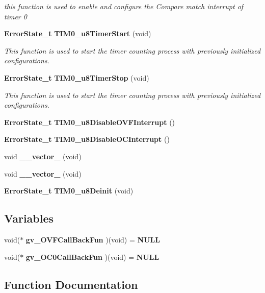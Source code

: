 \begin{DoxyCompactItemize}
\begin{DoxyCompactList}\small\item\em this function is used to enable and configure the Compare match interrupt of timer 0 \end{DoxyCompactList}\item 
\textbf{ Error\+State\+\_\+t} \textbf{ T\+I\+M0\+\_\+u8\+Timer\+Start} (void)
\begin{DoxyCompactList}\small\item\em This function is used to start the timer counting process with previously initialized configurations. \end{DoxyCompactList}\item 
\textbf{ Error\+State\+\_\+t} \textbf{ T\+I\+M0\+\_\+u8\+Timer\+Stop} (void)
\begin{DoxyCompactList}\small\item\em This function is used to start the timer counting process with previously initialized configurations. \end{DoxyCompactList}\item 
\textbf{ Error\+State\+\_\+t} \textbf{ T\+I\+M0\+\_\+u8\+Disable\+O\+V\+F\+Interrupt} ()
\item 
\textbf{ Error\+State\+\_\+t} \textbf{ T\+I\+M0\+\_\+u8\+Disable\+O\+C\+Interrupt} ()
\item 
void \textbf{ \+\_\+\+\_\+vector\+\_} (void)
\item 
void \textbf{ \+\_\+\+\_\+vector\+\_} (void)
\item 
\textbf{ Error\+State\+\_\+t} \textbf{ T\+I\+M0\+\_\+u8\+Deinit} (void)
\end{DoxyCompactItemize}
\subsection*{Variables}
\begin{DoxyCompactItemize}
\item 
void($\ast$ \textbf{ gv\+\_\+\+O\+V\+F\+Call\+Back\+Fun} )(void) =\textbf{ N\+U\+LL}
\item 
void($\ast$ \textbf{ gv\+\_\+\+O\+C0\+Call\+Back\+Fun} )(void) =\textbf{ N\+U\+LL}
\end{DoxyCompactItemize}


\subsection{Function Documentation}
\mbox{\label{_t_i_m_e_r0_8c_a74a0792c79b400c05d89ba6fccc8cd44}} 
